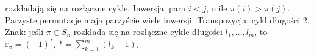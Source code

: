  rozkładają się na rozłączne cykle.
Inwersja: para $i < j$, o ile $\pi(i) > \pi(j)$.
Parzyste permutacje mają parzyście wiele inwersji.
Transpozycja: cykl długości $2$.
Znak: jeśli $\pi \in S_n$ rozkłada się na rozłączne cykle długości $l_1, \dots, l_m$, to $\varepsilon_\pi = (-1)^*$, $* = {\sum_{k=1}^m (l_k-1)}$.